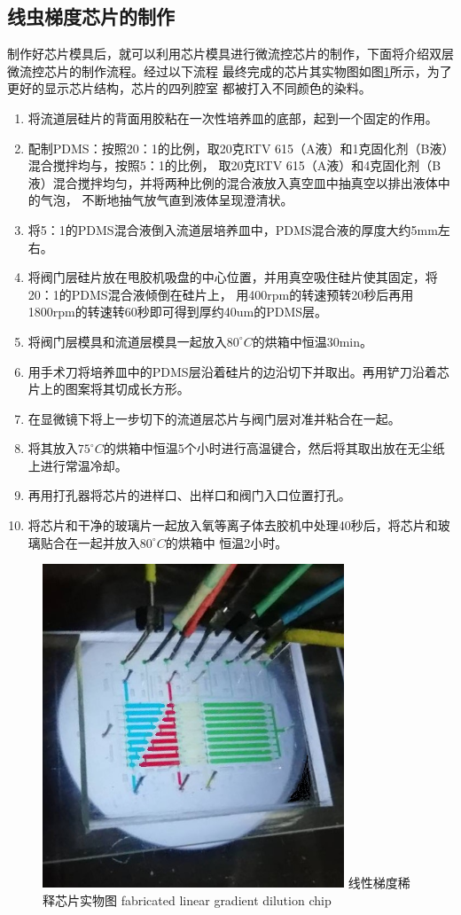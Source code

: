 \subsection{线虫梯度芯片的制作}
	制作好芯片模具后，就可以利用芯片模具进行微流控芯片的制作，下面将介绍双层微流控芯片的制作流程。经过以下流程
	最终完成的芯片其实物图如图\ref{fig:chap2:chip-fabric}所示，为了更好的显示芯片结构，芯片的四列腔室
	都被打入不同颜色的染料。
	\begin{enumerate}[label={\alph*)},font={\color{black!50!black}\bfseries}]
	\item 将流道层硅片的背面用胶粘在一次性培养皿的底部，起到一个固定的作用。
	\item 配制PDMS：按照20：1的比例，取20克RTV 615（A液）和1克固化剂（B液）混合搅拌均与，按照5：1的比例，
	取20克RTV 615（A液）和4克固化剂（B液）混合搅拌均匀，并将两种比例的混合液放入真空皿中抽真空以排出液体中的气泡，
	不断地抽气放气直到液体呈现澄清状。
	\item 将5：1的PDMS混合液倒入流道层培养皿中，PDMS混合液的厚度大约5mm左右。
	\item 将阀门层硅片放在甩胶机吸盘的中心位置，并用真空吸住硅片使其固定，将20：1的PDMS混合液倾倒在硅片上，
	用400rpm的转速预转20秒后再用1800rpm的转速转60秒即可得到厚约40um的PDMS层。
	\item 将阀门层模具和流道层模具一起放入$80^\circ C$的烘箱中恒温30min。
	\item 用手术刀将培养皿中的PDMS层沿着硅片的边沿切下并取出。再用铲刀沿着芯片上的图案将其切成长方形。
	\item 在显微镜下将上一步切下的流道层芯片与阀门层对准并粘合在一起。
	\item 将其放入$75^\circ C$的烘箱中恒温5个小时进行高温键合，然后将其取出放在无尘纸上进行常温冷却。
	\item 再用打孔器将芯片的进样口、出样口和阀门入口位置打孔。
	\item 将芯片和干净的玻璃片一起放入氧等离子体去胶机中处理40秒后，将芯片和玻璃贴合在一起并放入$80^\circ C$的烘箱中
	恒温2小时。
	\end{enumerate}
	\begin{figure}[htbp]
	  \centering
	  \includegraphics[width=9cm]{figure/chap2/fabric-chip.jpg}
	  \bicaption
		{线性梯度稀释芯片实物图}
		{fabricated linear gradient dilution chip}
	  \label{fig:chap2:chip-fabric}
	\end{figure}
